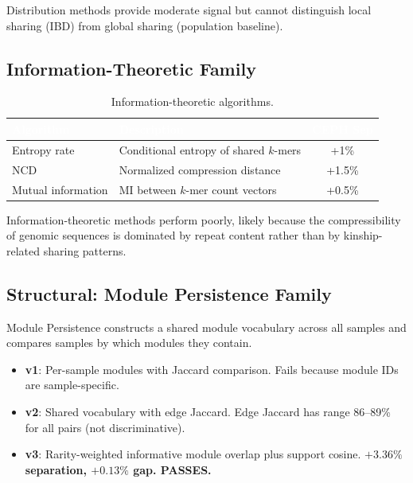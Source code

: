 \documentclass{../yalumba}
\begin{document}
Distribution methods provide moderate signal but cannot distinguish
local sharing (IBD) from global sharing (population baseline).

\subsection{Information-Theoretic Family}

\begin{table}[H]
  \centering
  \tablestyle
  \caption{Information-theoretic algorithms.}
  \label{tab:cat_info}
  \begin{tabular}{llc}
    \toprule
    \rowcolor{table-header}
    \textcolor{white}{\textbf{Algorithm}} &
    \textcolor{white}{\textbf{Description}} &
    \textcolor{white}{\textbf{CEPH Sep}} \\
    \midrule
    Entropy rate & Conditional entropy of shared $k$-mers & +1\% \\
    NCD~\cite{li2004ncd} & Normalized compression distance & +1.5\% \\
    Mutual information & MI between $k$-mer count vectors & +0.5\% \\
    \bottomrule
  \end{tabular}
\end{table}

Information-theoretic methods perform poorly, likely because the
compressibility of genomic sequences is dominated by repeat content
rather than by kinship-related sharing patterns.

\subsection{Structural: Module Persistence Family}

Module Persistence constructs a shared module vocabulary across all
samples and compares samples by which modules they contain.

\begin{itemize}
  \item \textbf{v1}: Per-sample modules with Jaccard comparison.
    Fails because module IDs are sample-specific.
  \item \textbf{v2}: Shared vocabulary with edge Jaccard.  Edge Jaccard
    has range 86--89\% for all pairs (not discriminative).
  \item \textbf{v3}: Rarity-weighted informative module overlap plus
    support cosine.  \textbf{$+3.36\%$ separation, $+0.13\%$ gap.  PASSES.}
\end{itemize}
\end{document}
